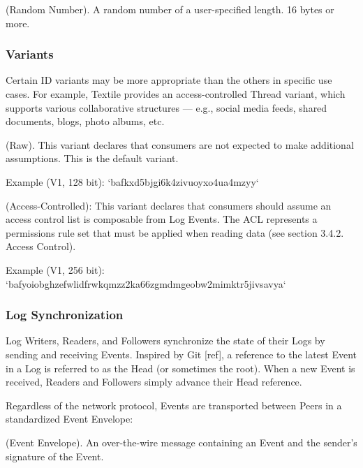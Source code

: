 \documentclass{comjnl}
\begin{document}
\begin{definition}
(Random Number). A random number of a user-specified length. 16 bytes or more.
\end{definition}

\subsubsection{Variants}

Certain ID variants may be more appropriate than the others in specific use cases. For example, Textile provides an access-controlled Thread variant, which supports various collaborative structures — e.g., social media feeds, shared documents, blogs, photo albums, etc.


\begin{definition}
(Raw). This variant declares that consumers are not expected to make additional assumptions. This is the default variant. 
\end{definition}

Example (V1, 128 bit): `bafkxd5bjgi6k4zivuoyxo4ua4mzyy`


\begin{definition}
(Access-Controlled): This variant declares that consumers should assume an access control list is composable from Log Events. The ACL represents a permissions rule set that must be applied when reading data (see section 3.4.2. Access Control).
\end{definition}

Example (V1, 256 bit): `bafyoiobghzefwlidfrwkqmzz2ka66zgmdmgeobw2mimktr5jivsavya`

\subsubsection{Log Synchronization}

Log Writers, Readers, and Followers synchronize the state of their Logs by sending and receiving Events. Inspired by Git [ref], a reference to the latest Event in a Log is referred to as the Head (or sometimes the root). When a new Event is received, Readers and Followers simply advance their Head reference.

Regardless of the network protocol, Events are transported between Peers in a standardized Event Envelope:

\begin{definition}
(Event Envelope). An over-the-wire message containing an Event and the sender’s signature of the Event.
\end{definition}
\end{document}

